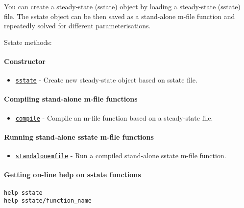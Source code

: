 

	You can create a steady-state (sstate) object by loading a steady-state
(sstate) file. The sstate object can be then saved as a stand-alone
m-file function and repeatedly solved for different parameterisations.

Sstate methods:

\paragraph{Constructor}

\begin{itemize}
\itemsep1pt\parskip0pt
\item
  \href{sstate/sstate}{\texttt{sstate}} - Create new steady-state object
  based on sstate file.
\end{itemize}

\paragraph{Compiling stand-alone m-file
functions}

\begin{itemize}
\itemsep1pt\parskip0pt
\item
  \href{sstate/compile}{\texttt{compile}} - Compile an m-file function
  based on a steady-state file.
\end{itemize}

\paragraph{Running stand-alone sstate m-file
functions}

\begin{itemize}
\itemsep1pt\parskip0pt
\item
  \href{sstate/standalonemfile}{\texttt{standalonemfile}} - Run a
  compiled stand-alone sstate m-file function.
\end{itemize}

\paragraph{Getting on-line help on sstate
functions}

\begin{verbatim}
help sstate
help sstate/function_name
\end{verbatim}



